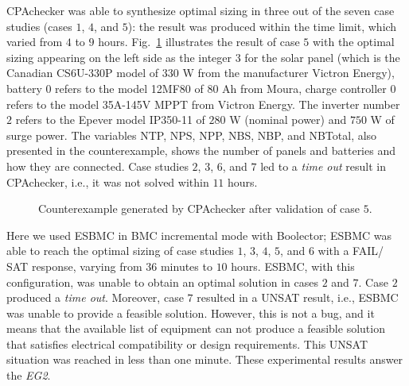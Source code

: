 \documentclass[runningheads]{llncs}
\begin{document}
CPAchecker was able to synthesize optimal sizing in three out of the seven case studies (cases $1$, $4$, and $5$): the result was produced within the time limit, which varied from $4$ to $9$ hours. 
Fig.~\ref{fig:CPAoptc1} illustrates the result of case $5$ with the optimal sizing appearing on the left side as the integer $3$ for the solar panel (which is the Canadian CS6U-330P model of $330$ W from the manufacturer Victron Energy), battery $0$ refers to the model 12MF80 of $80$ Ah from Moura, charge controller $0$ refers to the model 35A-145V MPPT from Victron Energy. The inverter number $2$ refers to the Epever model IP350-11 of $280$ W (nominal power) and $750$ W of surge power. The variables NTP, NPS, NPP, NBS, NBP, and NBTotal, also presented in the counterexample, shows the number of panels and batteries and how they are connected.
Case studies $2$, $3$, $6$, and $7$ led to a \textit{time out} result in CPAchecker, i.e., it was not solved within $11$ hours.  
%
\begin{figure}[h]
\centering
\caption{Counterexample generated by CPAchecker after validation of case $5$.}
\label{fig:CPAoptc1}
\end{figure}

Here we used ESBMC in BMC incremental mode with Boolector; ESBMC was able to reach the optimal sizing of case studies $1$, $3$, $4$, $5$, and $6$ with a FAIL/ SAT response, varying from $36$ minutes to $10$ hours. ESBMC, with this configuration, was unable to obtain an optimal solution in cases $2$ and $7$. Case $2$ produced a \textit{time out}. Moreover, case $7$ resulted in a UNSAT result, i.e., ESBMC was unable to provide a feasible solution. However, this is not a bug, and it means that the available list of equipment can not produce a feasible solution that satisfies electrical compatibility or design requirements. This UNSAT situation was reached in less than one minute. These experimental results answer the \textit{EG2}.
\end{document}
